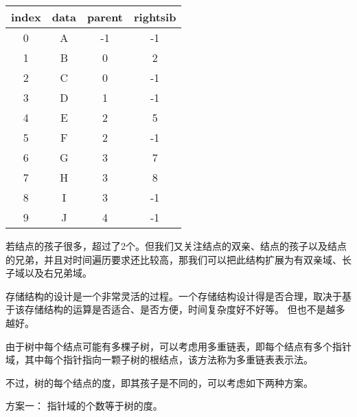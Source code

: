 \begin{frame}
\begin{small}
\begin{minipage}[t]{0.45\textwidth}
\begin{figure}
\centering
        
\end{figure}
\end{minipage}
\begin{minipage}[t]{0.45\textwidth}
\begin{table}
\begin{tabular}{c|c|c|c}\hline
index &data &parent &rightsib\\\hline
0&A&-1&-1\\
1&B&0 &2\\
2&C&0 &-1\\
3&D&1 &-1\\
4&E&2 &5\\
5&F&2 &-1\\
6&G&3 &7\\
7&H&3 &8\\
8&I&3 &-1\\
9&J&4 &-1\\\hline
\end{tabular}
\end{table}
\end{minipage}
\end{small}
\end{frame}
%
\begin{frame}
若结点的孩子很多，超过了2个。但我们又关注结点的双亲、结点的孩子以及结点的兄弟，并且对时间遍历要求还比较高，那我们可以把此结构扩展为有双亲域、长子域以及右兄弟域。
\end{frame}
%
\begin{frame}\ft{\secname}
存储结构的设计是一个非常灵活的过程。一个存储结构设计得是否合理，取决于基于该存储结构的运算是否适合、是否方便，时间复杂度好不好等。
但也不是越多越好。
\end{frame}
%
%
%
\begin{frame}
由于树中每个结点可能有多棵子树，可以考虑用多重链表，即\textcolor{acolor4}{每个结点有多个指针域，其中每个指针指向一颗子树的根结点，该方法称为多重链表表示法。} \vspace{0.2in}

不过，树的每个结点的度，即其孩子是不同的，可以考虑如下两种方案。
\end{frame}
%
\begin{frame}
\textcolor{acolor3}{方案一：}
指针域的个数等于树的度。
\begin{figure}
\centering
        
\end{figure}
\end{frame}
%

